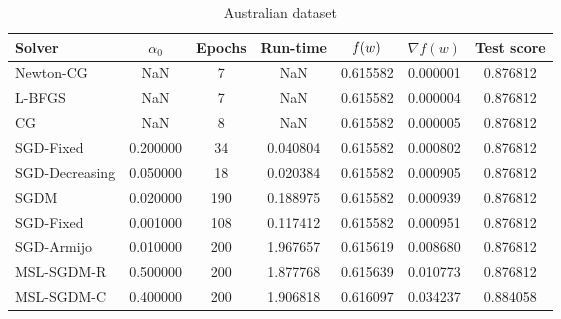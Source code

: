 \begin{table}
\caption{Australian dataset}
\label{tab:austr-tab}
\centering
\begin{tabular}{lS[round-precision=3]S[drop-zero-decimal]S[round-precision=4]S[round-precision=6]S[exponent-mode=scientific]S[round-precision=6]}
\toprule
Solver & {$\alpha_0$} & {Epochs} & {Run-time} & {$\operatorname*{\mathit{f}}(w)$} & {$\nabla f(w)$} & {Test score} \\
\midrule
Newton-CG & NaN & 7 & NaN & 0.615582 & 0.000001 & 0.876812 \\
L-BFGS & NaN & 7 & NaN & 0.615582 & 0.000004 & 0.876812 \\
CG & NaN & 8 & NaN & 0.615582 & 0.000005 & 0.876812 \\
SGD-Fixed & 0.200000 & 34 & 0.040804 & 0.615582 & 0.000802 & 0.876812 \\
SGD-Decreasing & 0.050000 & 18 & 0.020384 & 0.615582 & 0.000905 & 0.876812 \\
SGDM & 0.020000 & 190 & 0.188975 & 0.615582 & 0.000939 & 0.876812 \\
SGD-Fixed & 0.001000 & 108 & 0.117412 & 0.615582 & 0.000951 & 0.876812 \\
SGD-Armijo & 0.010000 & 200 & 1.967657 & 0.615619 & 0.008680 & 0.876812 \\
MSL-SGDM-R & 0.500000 & 200 & 1.877768 & 0.615639 & 0.010773 & 0.876812 \\
MSL-SGDM-C & 0.400000 & 200 & 1.906818 & 0.616097 & 0.034237 & 0.884058 \\
\bottomrule
\end{tabular}
\end{table}


